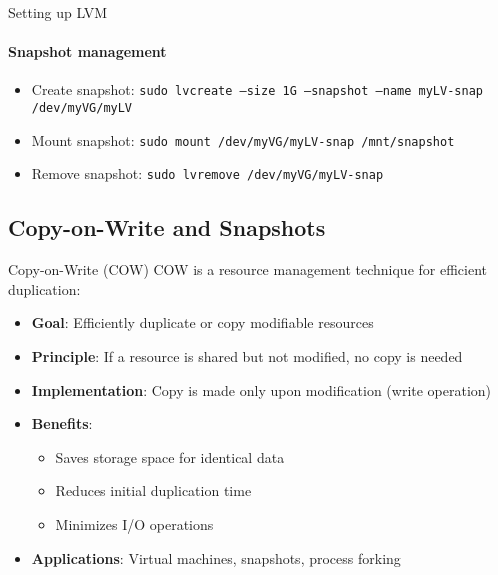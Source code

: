 \begin{KR}{Setting up LVM}
    \paragraph{Snapshot management}
    \begin{itemize}
        \item Create snapshot: \texttt{sudo lvcreate --size 1G --snapshot --name myLV-snap /dev/myVG/myLV}
        \item Mount snapshot: \texttt{sudo mount /dev/myVG/myLV-snap /mnt/snapshot}
        \item Remove snapshot: \texttt{sudo lvremove /dev/myVG/myLV-snap}
    \end{itemize}
\end{KR}

\subsection{Copy-on-Write and Snapshots}

\begin{concept}{Copy-on-Write (COW)}
    COW is a resource management technique for efficient duplication:
    \begin{itemize}
        \item \textbf{Goal}: Efficiently duplicate or copy modifiable resources
        \item \textbf{Principle}: If a resource is shared but not modified, no copy is needed
        \item \textbf{Implementation}: Copy is made only upon modification (write operation)
        \item \textbf{Benefits}:
            \begin{itemize}
                \item Saves storage space for identical data
                \item Reduces initial duplication time
                \item Minimizes I/O operations
            \end{itemize}
        \item \textbf{Applications}: Virtual machines, snapshots, process forking
    \end{itemize}
\end{concept}

